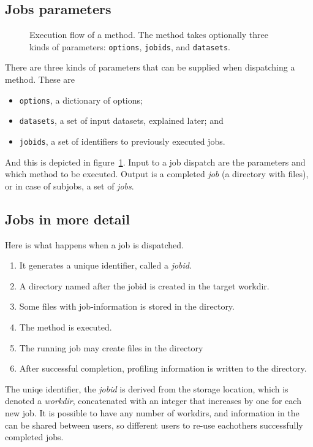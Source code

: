 \documentclass[a4paper]{article}
\begin{document}
\subsection{Jobs parameters}

\begin{figure}[t!]
  \begin{center}
    
    \caption{Execution flow of a method.  The method takes optionally
      three kinds of parameters: \texttt{options}, \texttt{jobids},
      and \texttt{datasets}.}
    \label{fig:execflow}
  \end{center}
\end{figure}

There are three kinds of parameters that can be supplied when
dispatching a method.  These are
\begin{itemize}
  \item[] \texttt{options}, a dictionary of options;
  \item[] \texttt{datasets}, a set of input datasets, explained later; and
  \item[] \texttt{jobids}, a set of identifiers to previously executed jobs.
\end{itemize}
And this is depicted in figure~\ref{fig:execflow}.  Input to a job
dispatch are the parameters and which method to be executed.  Output
is a completed \textsl{job} (a directory with files), or in case of
subjobs, a set of \textsl{jobs}.


\subsection{Jobs in more detail}

Here is what happens when a job is dispatched.
\begin{enumerate}
\item It generates a unique identifier, called a \textsl{jobid}.
\item A directory named after the jobid is created in the target workdir.
\item Some files with job-information is stored in the directory.
\item The method is executed.
\item The running job may create files in the directory
\item After successful completion, profiling information is written
  to the directory.
\end{enumerate}

The uniqe identifier, the \textsl{jobid} is derived from the storage
location, which is denoted a \textsl{workdir}, concatenated with an
integer that increases by one for each new job.  It is possible to
have any number of workdirs, and information in the can be shared
between users, so different users to re-use eachothers successfully
completed jobs.
\end{document}

